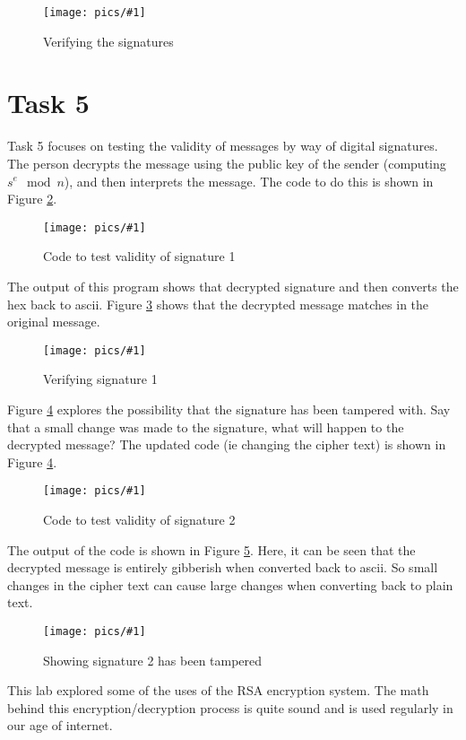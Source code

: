 \documentclass[11pt]{article}
\newcommand{\fig}[2]{ 
\begin{figure}[h]
	\centering
	\caption{#2}
	\texttt{[image: pics/\#1]}
	\label{fig:#1}
\end{figure} 
}
\begin{document}
\fig{task4.2}{Verifying the signatures}

\newpage
\section*{Task 5}

Task 5 focuses on testing the validity of messages by way of digital signatures. The person decrypts the message using the public key of the sender (computing $s^e \mod n$), and then interprets the message. The code to do this is shown in Figure \ref{fig:task5.1}.

\fig{task5.1}{Code to test validity of signature 1}

The output of this program shows that decrypted signature and then converts the hex back to ascii. Figure \ref{fig:task5.2} shows that the decrypted message matches in the original message.

\fig{task5.2}{Verifying signature 1}

Figure \ref{fig:task5.3} explores the possibility that the signature has been tampered with. Say that a small change was made to the signature, what will happen to the decrypted message? The updated code (ie changing the cipher text) is shown in Figure \ref{fig:task5.3}.

\fig{task5.3}{Code to test validity of signature 2}

The output of the code is shown in Figure \ref{fig:task5.4}. Here, it can be seen that the decrypted message is entirely gibberish when converted back to ascii. So small changes in the cipher text can cause large changes when converting back to plain text.

\fig{task5.4}{Showing signature 2 has been tampered}

This lab explored some of the uses of the RSA encryption system. The math behind this encryption/decryption process is quite sound and is used regularly in our age of internet.
\end{document}
